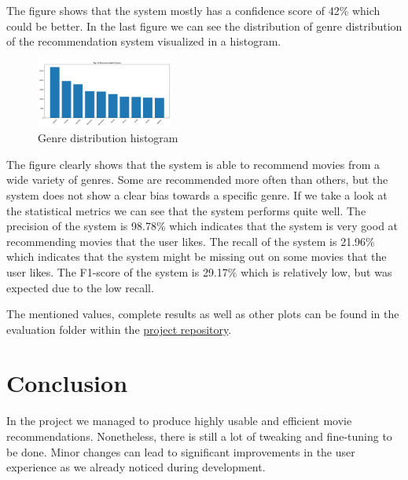 \documentclass[12pt,a4paper]{article}
\begin{document}
\noindent The figure shows that the system mostly has a confidence score of 42\% which could be better.
In the last figure we can see the distribution of genre distribution of the recommendation system visualized in a histogram.

\begin{figure}[H]
  \centering
  \includegraphics[width=0.4\textwidth]{../assets/top_genres.png}
  \caption{Genre distribution histogram}
\end{figure}

\noindent The figure clearly shows that the system is able to recommend movies from a wide variety of genres.
Some are recommended more often than others, but the system does not show a clear bias towards a specific genre.
\newline \noindent If we take a look at the statistical metrics we can see that the system performs quite well.
The precision of the system is 98.78\% which indicates that the system is very good at recommending movies that the user likes.
The recall of the system is 21.96\% which indicates that the system might be missing out on some movies that the user likes.
The F1-score of the system is 29.17\% which is relatively low, but was expected due to the low recall.

The mentioned values, complete results as well as other plots can be found in the evaluation folder within the \href{https://github.com/IImpaq/air-2024/evaluation}{project repository}.

\section{Conclusion}

In the project we managed to produce highly usable and efficient movie recommendations.
Nonetheless, there is still a lot of tweaking and fine-tuning to be done.
Minor changes can lead to significant improvements in the user experience as we already noticed during development.
\end{document}
